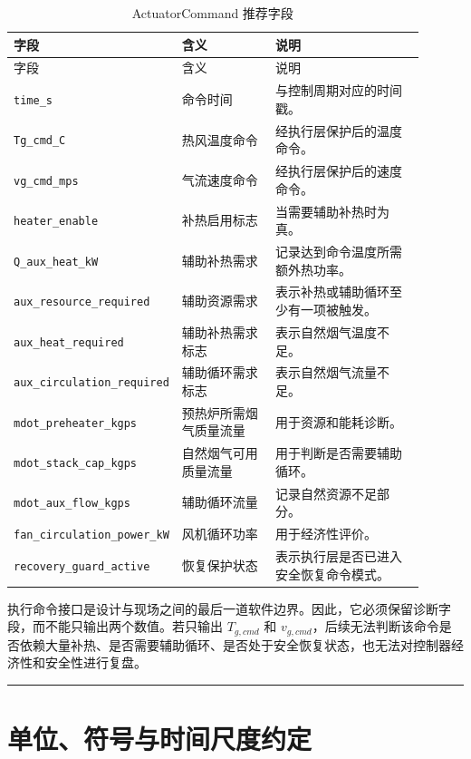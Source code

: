 \documentclass[UTF8,openany,zihao=-4,oneside]{ctexbook}
\newcommand{\manualdivider}{\par\vspace{0.6em}\noindent\textcolor{FGLine}{\rule{\linewidth}{0.7pt}}\vspace{0.6em}\par}
\begin{document}
\begin{longtable}{@{}p{0.25\linewidth}p{0.25\linewidth}p{0.40\linewidth}@{}}
\caption{ActuatorCommand 推荐字段}\label{tab:actuatorcommand}\\
\toprule
字段 & 含义 & 说明 \\
\midrule
\endfirsthead
\toprule
字段 & 含义 & 说明 \\
\midrule
\endhead
\texttt{time\_s} & 命令时间 & 与控制周期对应的时间戳。 \\
\texttt{Tg\_cmd\_C} & 热风温度命令 & 经执行层保护后的温度命令。 \\
\texttt{vg\_cmd\_mps} & 气流速度命令 & 经执行层保护后的速度命令。 \\
\texttt{heater\_enable} & 补热启用标志 & 当需要辅助补热时为真。 \\
\texttt{Q\_aux\_heat\_kW} & 辅助补热需求 & 记录达到命令温度所需额外热功率。 \\
\texttt{aux\_resource\_required} & 辅助资源需求 & 表示补热或辅助循环至少有一项被触发。 \\
\texttt{aux\_heat\_required} & 辅助补热需求标志 & 表示自然烟气温度不足。 \\
\texttt{aux\_circulation\_required} & 辅助循环需求标志 & 表示自然烟气流量不足。 \\
\texttt{mdot\_preheater\_kgps} & 预热炉所需烟气质量流量 & 用于资源和能耗诊断。 \\
\texttt{mdot\_stack\_cap\_kgps} & 自然烟气可用质量流量 & 用于判断是否需要辅助循环。 \\
\texttt{mdot\_aux\_flow\_kgps} & 辅助循环流量 & 记录自然资源不足部分。 \\
\texttt{fan\_circulation\_power\_kW} & 风机循环功率 & 用于经济性评价。 \\
\texttt{recovery\_guard\_active} & 恢复保护状态 & 表示执行层是否已进入安全恢复命令模式。 \\
\bottomrule
\end{longtable}

执行命令接口是设计与现场之间的最后一道软件边界。因此，它必须保留诊断字段，而不能只输出两个数值。若只输出 \(T_{g,cmd}\) 和 \(v_{g,cmd}\)，后续无法判断该命令是否依赖大量补热、是否需要辅助循环、是否处于安全恢复状态，也无法对控制器经济性和安全性进行复盘。

\manualdivider

\section{单位、符号与时间尺度约定}\label{sec:units-time}
\end{document}
